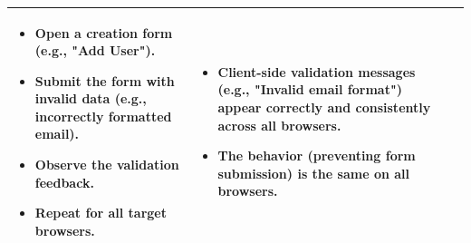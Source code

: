 \begin{longtable}{|>{\scriptsize\raggedright\arraybackslash}p{3cm}|>{\raggedright\arraybackslash}p{3.5cm}|>{\raggedright\arraybackslash}p{4cm}|>{\raggedright\arraybackslash}p{5cm}|}
    \begin{itemize}[noitemsep, topsep=0pt, partopsep=0pt, leftmargin=*]
        \item Open a creation form (e.g., "Add User").
        \item Submit the form with invalid data (e.g., incorrectly formatted email).
        \item Observe the validation feedback.
        \item Repeat for all target browsers.
    \end{itemize} & 
    \begin{itemize}[noitemsep, topsep=0pt, partopsep=0pt, leftmargin=*]
        \item Client-side validation messages (e.g., "Invalid email format") appear correctly and consistently across all browsers.
        \item The behavior (preventing form submission) is the same on all browsers.
    \end{itemize} \\ \hline


\end{longtable}
